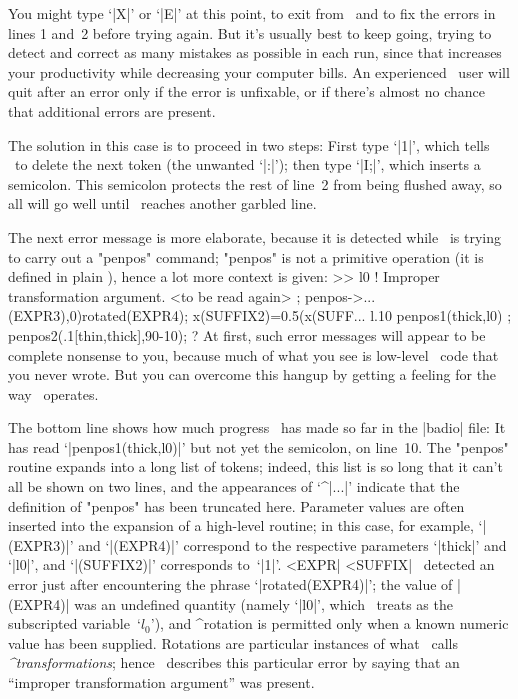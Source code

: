 You might type `|X|' or `|E|' at this point, to exit from \MF\ and to fix
the errors in lines 1 and~2 before trying again. But it's usually best
to keep going, trying to detect and correct as many mistakes as possible
in each run, since that increases your productivity while
decreasing your computer bills. An experienced \MF\ user will quit
after an error only if the error is unfixable, or if there's almost no
chance that additional errors are present.

The solution in this case is to proceed in two steps: First type `|1|',
which tells \MF\ to delete the next token (the unwanted `|:|'); then type
`|I;|', which inserts a semicolon. This semicolon protects the rest of line~2
from being flushed away,
so all will go well until \MF\ reaches another garbled line.

The next error message is more elaborate, because it is detected while
\MF\ is trying to carry out a "penpos" command; "penpos" is not a
primitive operation (it is defined in plain \MF), hence a lot more
context is given:
\begintt
>> l0
! Improper transformation argument.
<to be read again>
                   ;
penpos->...(EXPR3),0)rotated(EXPR4);
                                    x(SUFFIX2)=0.5(x(SUFF...
l.10  penpos1(thick,l0)
                       ; penpos2(.1[thin,thick],90-10);
?
\endtt
At first, such error messages will appear to be complete nonsense to you,
because much of what you see is low-level \MF\ code that you never wrote. But
you can overcome this hangup by getting a feeling for the way \MF\ operates.

The bottom line shows how much progress \MF\ has made so far in the |badio|
file:  It has read `|penpos1(thick,l0)|' but not yet the semicolon, on line~10.
The "penpos" routine expands into a long list of tokens; indeed, this list
is so long that it can't all be shown on two lines, and the appearances of
`^|...|' indicate that the definition of "penpos" has been truncated here.
Parameter values are often inserted into the expansion of a high-level
routine; in this case, for example, `|(EXPR3)|' and `|(EXPR4)|' correspond
to the respective parameters `|thick|' and `|l0|', and `|(SUFFIX2)|'
corresponds to~`|1|'. ^^|EXPR| ^^|SUFFIX|
\MF\ detected an error just after encountering the phrase `|rotated(EXPR4)|';
the value of |(EXPR4)| was an undefined quantity (namely `|l0|',
which \MF\ treats as the subscripted variable~`$l_0$'\thinspace), and
^{rotation} is permitted only when a known numeric value has been supplied.
Rotations are particular instances of what \MF\ calls {\sl^{transformations}\/};
hence \MF\ describes this particular error by saying that an ``improper
transformation argument'' was present.

